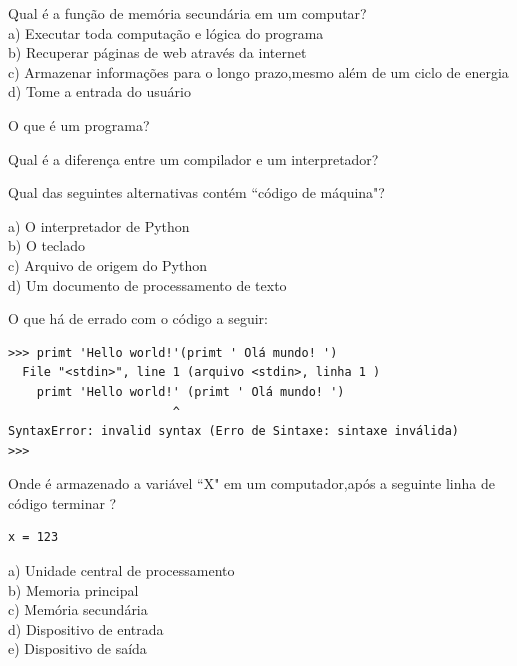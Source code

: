 \begin{ex}
Qual é a função de memória secundária em um computar?\\
\noindent a) Executar toda computação e lógica do programa\\
b) Recuperar páginas de web através da internet\\
c) Armazenar informações para o longo prazo,mesmo além de um ciclo de energia\\
d) Tome a entrada do usuário
\end{ex}

\begin{ex}
O que é um programa?
\end{ex}

\begin{ex}
Qual é a diferença entre um compilador e um interpretador?
\end{ex}

\begin{ex}
Qual das seguintes alternativas contém ``código de máquina"?


\noindent  a) O interpretador de Python\\
b) O teclado\\
c) Arquivo de origem do Python\\
d) Um documento de processamento de texto 
\end{ex}

\begin{ex}
O que há de errado com o código a seguir:


\begin{verbatim}
>>> primt 'Hello world!'(primt ' Olá mundo! ')
  File "<stdin>", line 1 (arquivo <stdin>, linha 1 )
    primt 'Hello world!' (primt ' Olá mundo! ')
                       ^
SyntaxError: invalid syntax (Erro de Sintaxe: sintaxe inválida)
>>> 
\end{verbatim}


\end{ex}

\begin{ex}
Onde é armazenado a variável ``X" em um computador,após a seguinte  linha de código terminar ? 


\begin{verbatim}
x = 123
\end{verbatim}

%
\noindent  a) Unidade central de processamento\\
b) Memoria principal\\
c) Memória secundária \\
d) Dispositivo de entrada\\
e) Dispositivo de saída
\end{ex}

